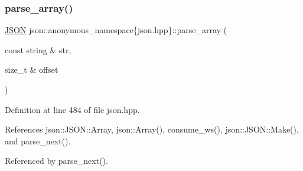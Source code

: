 \subsubsection{\texorpdfstring{parse\+\_\+array()}{parse\_array()}}
{\footnotesize\ttfamily \mbox{\hyperlink{classjson_1_1_j_s_o_n}{J\+S\+ON}} json\+::anonymous\+\_\+namespace\{json.\+hpp\}\+::parse\+\_\+array (\begin{DoxyParamCaption}\item[{const string \&}]{str,  }\item[{size\+\_\+t \&}]{offset }\end{DoxyParamCaption})}



Definition at line 484 of file json.\+hpp.



References json\+::\+J\+S\+O\+N\+::\+Array, json\+::\+Array(), consume\+\_\+ws(), json\+::\+J\+S\+O\+N\+::\+Make(), and parse\+\_\+next().



Referenced by parse\+\_\+next().


